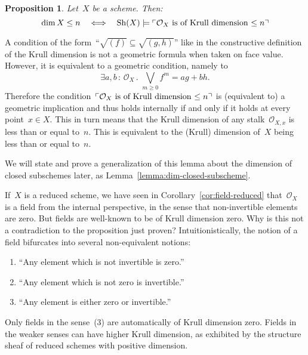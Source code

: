 \documentclass[10pt,reqno,a4paper]{amsbook}
\makeatletter
\theoremstyle{definition}
\theoremstyle{plain}
\newtheorem{prop}[defn]{Proposition}
\theoremstyle{remark}
\renewcommand{\O}{\mathcal{O}}
\newcommand{\Sh}{\mathrm{Sh}}
\newcommand{\?}{\,{:}\,}
\renewcommand{\_}{\mathpunct{.}\,}
\newcommand{\speak}[1]{\ulcorner\text{\textnormal{#1}}\urcorner}
\newcommand{\defeq}{\vcentcolon=}
\renewenvironment{proof}[1][\proofname]{\par
  \pushQED{\qed}%
  \normalfont \topsep6\p@\@plus6\p@\relax
  \trivlist
  \item[\hskip\labelsep
        \itshape
    #1\@addpunct{.}]\ignorespaces
}{%
  \popQED\endtrivlist\@endpefalse
}
\makeatother
\begin{document}
\begin{prop}\label{prop:dimension-scheme-ox}
Let~$X$ be a scheme. Then:
\[ \dim X \leq n \quad\Longleftrightarrow\quad
  \Sh(X) \models \speak{$\O_X$ is of Krull dimension~$\leq n$}
  \]
\end{prop}
\begin{proof}

A condition of the form~``$\sqrt{(f)} \subseteq \sqrt{(g,h)}$''
like in the constructive definition of the Krull dimension is not a geometric
formula when taken on face value. However, it is equivalent to a geometric
condition, namely to
\[ \exists a,b\?\O_X\_ \bigvee_{m \geq 0} f^m = ag + bh. \]
Therefore the condition~$\speak{$\O_X$ is of Krull
dimension~$\leq n$}$ is (equivalent to) a geometric implication and thus holds
internally if and only if it holds at every point~$x \in X$. This in turn means that the
Krull dimension of any stalk~$\O_{X,x}$ is less than or equal to~$n$. This is
equivalent to the (Krull) dimension of~$X$ being less than or equal to~$n$.
\end{proof}

We will state and prove a generalization of this lemma about the dimension of closed
subschemes later, as Lemma~\ref{lemma:dim-closed-subscheme}.

If~$X$ is a reduced scheme, we have seen in Corollary~\ref{cor:field-reduced}
that~$\O_X$ is a field from the internal perspective, in the sense that
non-invertible elements are zero. But fields are well-known to be of Krull
dimension zero. Why is this not a contradiction to the proposition just proven?
Intuitionistically, the notion of a field bifurcates into several
non-equivalent notions:
\begin{enumerate}
\item ``Any element which is not invertible is zero.''
\item ``Any element which is not zero is invertible.''
\item ``Any element is either zero or invertible.''
\end{enumerate}
Only fields in the sense~(3) are automatically of Krull dimension zero.
Fields in the weaker senses can have higher Krull dimension, as exhibited by
the structure sheaf of reduced schemes with positive dimension.
\end{document}
